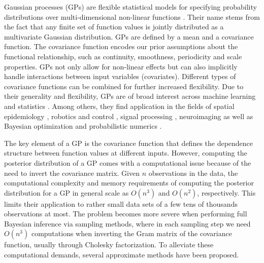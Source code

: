 Gaussian processes (GPs) are flexible statistical models for specifying probability distributions over multi-dimensional non-linear functions \citep{rasmussen2006gaussian,neal1997monte}. Their name stems from the fact that any finite set of function values is jointly distributed as a multivariate Gaussian distribution. GPs are defined by a mean and a covariance function. The covariance function encodes our prior assumptions about the functional relationship, such as continuity, smoothness, periodicity and scale properties. GPs not only allow for non-linear effects but can also implicitly handle interactions between input variables (covariates). Different types of covariance functions can be combined for further increased flexibility. Due to their generality and flexibility, GPs are of broad interest across machine learning and statistics \citep{rasmussen2006gaussian,neal1997monte}. Among others, they find application in the fields of spatial epidemiology \citep{diggle2013statistical,carlin2014hierarchical}, robotics and control \citep{deisenroth2015gaussian}, signal processing \citep{sarkka2013spatiotemporal}, neuroimaging \citep{andersen2017} as well as Bayesian optimization and probabilistic numerics \citep{roberts2010bayesian,briol2015probabilistic,hennig2015probabilistic}.

The key element of a GP is the covariance function that defines the dependence structure between function values at different inputs. However, computing the posterior distribution of a GP comes with a computational issue because of the need to invert the covariance matrix. Given $n$ observations in the data, the computational complexity and memory requirements of computing the posterior distribution for a GP in general scale as $O(n^3)$ and $O(n^2)$, respectively. This limits their application to rather small data sets of a few tens of thousands observations at most. The problem becomes more severe when performing full Bayesian inference via sampling methods, where in each sampling step we need $O(n^3)$ computations when inverting the Gram matrix of the covariance function, usually through Cholesky factorization. To alleviate these computational demands, several approximate methods have been proposed. 

